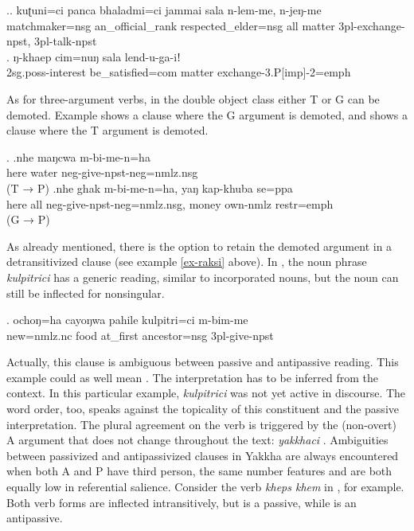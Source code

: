 \ex.\ag. kuʈuni=ci panca bhaladmi=ci jammai sala   n-lem-me, n-jeŋ-me\\
	matchmaker{\sc =nsg} an\_official\_rank  respected\_elder{\sc =nsg} all matter {\sc 3pl-}exchange{\sc -npst}, {\sc 3pl-}talk{\sc -npst}		\\
	 
\bg. ŋ-khaep cim=nuŋ sala lend-u-ga-iǃ\\
	{\sc 2sg.poss-}interest be\_satisfied{\sc =com} matter exchange{\sc -3.P[imp]-2=emph}\\

As for three-argument verbs, in the double object class  either T or  G can be demoted. Example \Next[a] shows a clause where the G argument is demoted, and \Next[b] shows a clause where the T argument is demoted.  

\ex. \ag.nhe maŋcwa m-bi-me-n=ha\\
here water {\sc neg-}give{\sc [3sg]-npst-neg=nmlz.nsg}	\\
 (T → P)
 \bg.nhe ghak m-bi-me-n=ha, yaŋ kap-khuba se=ppa\\
here all {\sc neg-}give{\sc [3sg]-npst-neg=nmlz.nsg}, money own{\sc -nmlz} {\sc restr=emph} \\
 (G → P)


As already mentioned, there is  the option to retain the demoted argument in a  detransitivized clause (see example \ref{ex-raksi} above). In \Next, the noun phrase \emph{kulpitrici} has a generic reading, similar to incorporated nouns, but the noun can still be inflected for nonsingular. 

\exg. ochoŋ=ha cayoŋwa  pahile   kulpitri=ci  m-bim-me\\
new{\sc =nmlz.nc} food at\_first ancestor{\sc =nsg} {\sc 3pl-}give{\sc -npst}\\
 

Actually, this clause is ambiguous between passive and antipassive reading. This example could as well mean . The interpretation has to be inferred from the context. In this particular example, \emph{kulpitrici} was not yet active in discourse. The word order, too, speaks against the topicality of this constituent and the passive interpretation. The plural agreement on the verb is triggered by the (non-overt) A argument that does not change throughout the text: \emph{yakkhaci} . Ambiguities between passivized and antipassivized clauses in Yakkha are always encountered when both A and P have third person, the same number features and are both equally low in referential salience. Consider the verb \emph{kheps \ti khem}  in \Next, for example. Both verb forms are inflected intransitively, but \Next[a] is a passive, while \Next[b] is an antipassive.

